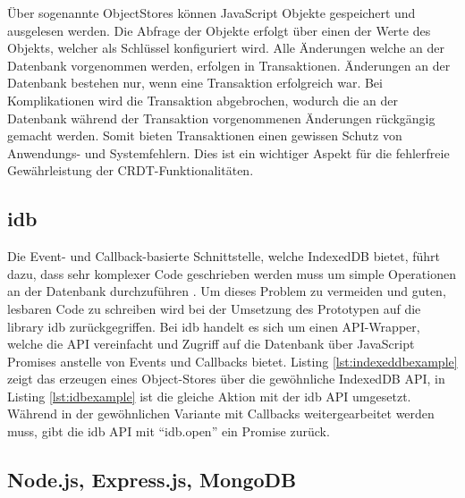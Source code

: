 \documentclass[a4paper, 12pt]{scrreprt}
\begin{document}
Über sogenannte ObjectStores können JavaScript Objekte gespeichert und ausgelesen werden. Die Abfrage der Objekte erfolgt über einen der Werte des Objekts, welcher als Schlüssel konfiguriert wird. Alle Änderungen welche an der Datenbank vorgenommen werden, erfolgen in Transaktionen. Änderungen an der Datenbank bestehen nur, wenn eine Transaktion erfolgreich war. Bei Komplikationen wird die Transaktion abgebrochen, wodurch die an der Datenbank während der Transaktion vorgenommenen Änderungen rückgängig gemacht werden. Somit bieten Transaktionen einen gewissen Schutz von Anwendungs- und Systemfehlern. Dies ist ein wichtiger Aspekt für die fehlerfreie Gewährleistung der CRDT-Funktionalitäten.
\subsection{idb}
Die Event- und Callback-basierte Schnittstelle, welche IndexedDB bietet, führt dazu, dass sehr komplexer Code geschrieben werden muss um simple Operationen an der Datenbank durchzuführen \autocite{InproceedingsIDBdoof}. Um dieses Problem zu vermeiden und guten, lesbaren Code zu schreiben wird bei der Umsetzung des Prototypen auf die library idb zurückgegriffen. Bei idb handelt es sich um einen API-Wrapper, welche die API vereinfacht und Zugriff auf die Datenbank über JavaScript Promises anstelle von Events und Callbacks bietet. Listing \ref{lst:indexeddbexample} zeigt das erzeugen eines Object-Stores über die gewöhnliche IndexedDB API, in Listing \ref{lst:idbexample} ist die gleiche Aktion mit der idb API umgesetzt. Während in der gewöhnlichen Variante mit Callbacks weitergearbeitet werden muss, gibt die idb API mit \enquote{idb.open} ein Promise zurück.

\begin{minipage}{\linewidth}

\end{minipage}

\begin{minipage}{\linewidth}

\end{minipage}

\subsection{Node.js, Express.js, MongoDB}
\end{document}

